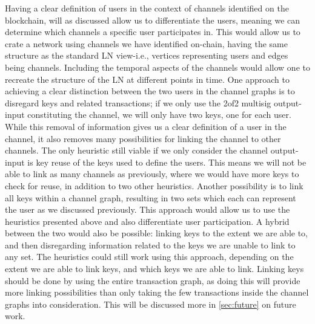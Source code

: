 Having a clear definition of users in the context of channels identified on the blockchain, will as discussed allow us to differentiate the users, meaning we can determine which channels a specific user participates in. This would allow us to crate a network using channels we have identified on-chain, having the same structure as the standard LN view-i.e., vertices representing users and edges being channels. Including the temporal aspects of the channels would allow one to recreate the structure of the LN at different points in time. 
One approach to achieving a clear distinction between the two users in the channel graphs is to disregard keys and related transactions; if we only use the 2of2 multisig output-input constituting the channel, we will only have two keys, one for each user. While this removal of information gives us a clear definition of a user in the channel, it also removes many possibilities for linking the channel to other channels. The only heuristic still viable if we only consider the channel output-input is key reuse of the keys used to define the users. This means we will not be able to link as many channels as previously, where we would have more keys to check for reuse, in addition to two other heuristics. Another possibility is to link all keys within a channel graph, resulting in two sets which each can represent the user as we discussed previously. This approach would allow us to use the heuristics presented above and also differentiate user participation. A hybrid between the two would also be possible: linking keys to the extent we are able to, and then disregarding information related to the keys we are unable to link to any set. The heuristics could still work using this approach, depending on the extent we are able to link keys, and which keys we are able to link. Linking keys should be done by using the entire transaction graph, as doing this will provide more linking possibilities than only taking the few transactions inside the channel graphs into consideration. This will be discussed more in \cref{sec:future} on future work.

